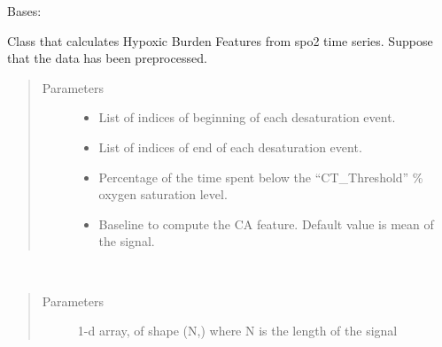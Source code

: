\documentclass[letterpaper,10pt,english]{sphinxmanual}
\begin{document}
\begin{fulllineitems}
\label{\detokenize{OBM:OBM.HypoxicBurdenMeasures.HypoxicBurdenMeasures}}
Bases: 

Class that calculates Hypoxic Burden Features from spo2 time series.
Suppose that the data has been preprocessed.
\begin{quote}\begin{description}
\item[{Parameters}] \leavevmode\begin{itemize}
\item {} 
 \textendash{} List of indices of beginning of each desaturation event.

\item {} 
 \textendash{} List of indices of end of each desaturation event.

\item {} 
 \textendash{} Percentage of the time spent below the “CT\_Threshold” \% oxygen saturation level.

\item {} 
 \textendash{} Baseline to compute the CA feature. Default value is mean of the signal.

\end{itemize}

\end{description}\end{quote}

\begin{fulllineitems}
\label{\detokenize{OBM:OBM.HypoxicBurdenMeasures.HypoxicBurdenMeasures.compute}}~\begin{quote}\begin{description}
\item[{Parameters}] \leavevmode
{} \textendash{} 1-d array, of shape (N,) where N is the length of the signal


\end{description}
\end{quote}
\end{fulllineitems}
\end{fulllineitems}
\end{document}
